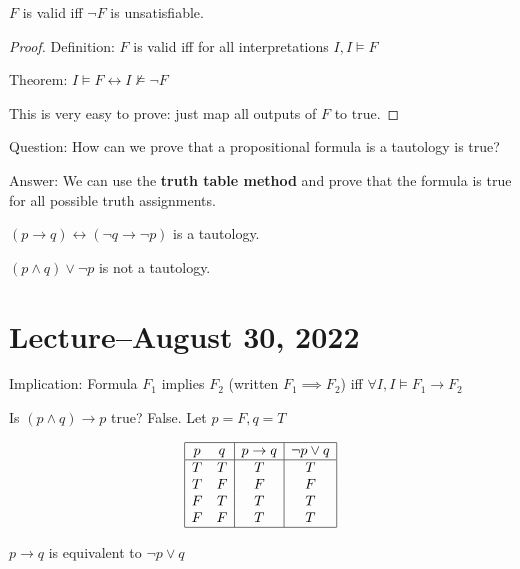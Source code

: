 \documentclass[8pt]{scrreprt}
\newcommand{\true}{\text{true}}
\begin{document}
\begin{landscape}
\begin{multicols*}{3}
\begin{theorem}
	$F$ is valid iff $\neg F$ is unsatisfiable.

	\begin{proof}
		Definition: $F$ is valid iff for all interpretations $I, I\models F$

		Theorem: $I\models F \leftrightarrow I\not\models \neg F$

		This is very easy to prove: just map all outputs of $F$ to $\true$.
	\end{proof}
\end{theorem}

Question: How can we prove that a propositional formula is a tautology is true?

Answer: We can use the \textbf{truth table method} and prove that the formula is true for all possible truth assignments.

\begin{example}[Tautology]
	$(p\rightarrow q)\leftrightarrow (\neg q \rightarrow \neg p)$ is a tautology.

	$(p\land q)\lor \neg p$ is not a tautology.
\end{example}

\section{Lecture--August 30, 2022}

Implication: Formula $F_1$ implies $F_2$ (written $F_1\implies F_2$) iff
$\forall I, I\models F_1\rightarrow F_2$

\begin{example}
	Is $(p\land q)\rightarrow p$ true? False. Let $p=F, q=T$

	\[
		\begin{array}{|c c|c|c|}
			\hline
			p & q & p\rightarrow q & \neg p \lor q \\
			\hline
			T & T & T              & T             \\
			T & F & F              & F             \\
			F & T & T              & T             \\
			F & F & T              & T             \\
			\hline
		\end{array}
	\]
\end{example}

\begin{definition}
	$p\rightarrow q$ is equivalent to $\neg p\lor q$
\end{definition}


\end{multicols*}
\end{landscape}
\end{document}
